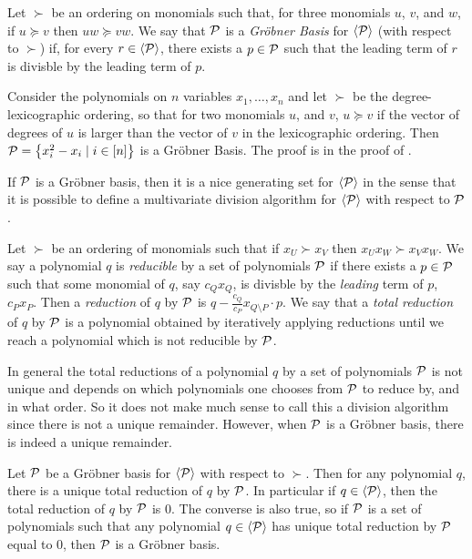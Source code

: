 \begin{definition}\label{def:grobner}
    Let $\succ$ be an ordering on monomials such that, for three monomials $u$, $v$, and $w$, if $u \succeq v$ then $uw \succeq vw$. We say that $\mathcal P$ is a \emph{Gr\"obner Basis} for $\langle \mathcal P \rangle$ (with respect to $\succ$) if, for every $r \in \langle \mathcal P \rangle$, there exists a $p \in \mathcal P$ such that the leading term of $r$ is divisble by the leading term of $p$.
\end{definition}
\begin{example}\label{ex:grobner}
Consider the polynomials on $n$ variables $x_1,\dots,x_n$ and let $\succ$ be the degree-lexicographic ordering, so that for two monomials $u$, and $v$, $u \succeq v$ if the vector of degrees of $u$ is larger than the vector of $v$ in the lexicographic ordering. Then $\mathcal P = \left\{x_i^2 - x_i \mid i \in [n]\right\}$ is a Gr\"obner Basis. The proof is in the proof of .
\end{example}
If $\mathcal P$ is a Gr\"obner basis, then it is a nice generating set for $\langle \mathcal P \rangle$ in the sense that it is possible to define a multivariate division algorithm for $\langle \mathcal P \rangle$ with respect to $\mathcal P$.
\begin{definition}
Let $\succ$ be an ordering of monomials such that if $x_U \succ x_V$ then $x_Ux_W \succ x_Vx_W$. We say a polynomial $q$ is \emph{reducible} by a set of polynomials $\mathcal P$ if there exists a $p \in \mathcal P$ such that some monomial of $q$, say $c_Qx_Q$, is divisble by the \emph{leading} term of $p$, $c_Px_P$. Then a \emph{reduction} of $q$ by $\mathcal P$ is $q - \frac{c_Q}{c_P}x_{Q \setminus P} \cdot p$. We say that a \emph{total reduction} of $q$ by $\mathcal P$ is a polynomial obtained by iteratively applying reductions until we reach a polynomial which is not reducible by $\mathcal P$.
\end{definition}
In general the total reductions of a polynomial $q$ by a set of polynomials $\mathcal P$ is not unique and depends on which polynomials one chooses from $\mathcal P$ to reduce by, and in what order. So it does not make much sense to call this a division algorithm since there is not a unique remainder. However, when $\mathcal P$ is a Gr\"obner basis, there is indeed a unique remainder.
\begin{proposition}\label{prop:grobner-unique}
Let $\mathcal P$ be a Gr\"obner basis for $\langle \mathcal P \rangle$ with respect to $\succ$. Then for any polynomial $q$, there is a unique total reduction of $q$ by $\mathcal P$. In particular if $q \in \langle \mathcal P \rangle$, then the total reduction of $q$ by $\mathcal P$ is $0$. The converse is also true, so if $\mathcal P$ is a set of polynomials such that any polynomial $q \in \langle \mathcal P \rangle$ has unique total reduction by $\mathcal P$ equal to $0$, then $\mathcal P$ is a Gr\"obner basis.
\end{proposition}

